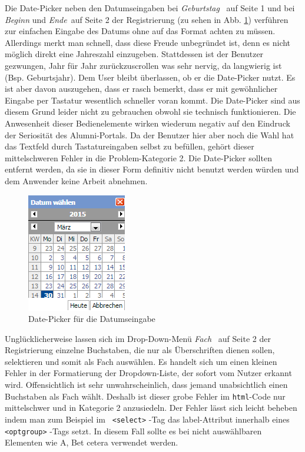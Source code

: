 { Die Date-Picker neben den Datumseingaben bei \emph{Geburtstag} ~auf Seite 1 und bei \emph{Beginn} und \emph{Ende}~auf Seite 2 der Registrierung (zu sehen in Abb. \ref{fig:regdatepick}) verführen zur einfachen Eingabe des Datums ohne auf das Format achten zu müssen. Allerdings merkt man schnell, dass diese Freude unbegründet ist, denn es nicht möglich direkt eine Jahreszahl einzugeben. Stattdessen ist der Benutzer gezwungen, Jahr für Jahr zurückzuscrollen was sehr nervig, da langwierig ist (Bsp. Geburtsjahr).
}
{ Dem User bleibt überlassen, ob er die Date-Picker nutzt. Es ist aber davon auszugehen, dass er rasch bemerkt, dass er mit gewöhnlicher Eingabe per Tastatur wesentlich schneller voran kommt. Die Date-Picker sind aus diesem Grund leider nicht zu gebrauchen obwohl sie technisch funktionieren. Die Anwesenheit dieser Bedienelemente wirken wiederum negativ auf den Eindruck der Seriosität des Alumni-Portals. Da der Benutzer hier aber noch die Wahl hat das Textfeld durch Tastatureingaben selbst zu befüllen, gehört dieser mittelschweren Fehler in die Problem-Kategorie 2.
}
{ Die Date-Picker sollten entfernt werden, da sie in dieser Form definitiv nicht benutzt werden würden und dem Anwender keine Arbeit abnehmen.
}
\label{prob:reg:uselesspickerz}

\begin{figure}
	\centering
		\includegraphics{figures/datepicker.png}
	\caption{Date-Picker für die Datumseingabe}
	\label{fig:regdatepick}
\end{figure}

{ Unglücklicherweise lassen sich im Drop-Down-Menü  \emph{Fach} ~auf Seite 2 der Registrierung einzelne Buchstaben, die nur als Überschriften dienen sollen, selektieren und somit als Fach auswählen. 
}
{ Es handelt sich um einen kleinen Fehler in der Formatierung der Dropdown-Liste, der sofort vom Nutzer erkannt wird. Offensichtlich ist sehr unwahrscheinlich, dass jemand unabsichtlich einen Buchstaben als Fach wählt. Deshalb ist dieser grobe Fehler im \texttt{html}-Code nur mittelschwer und in Kategorie 2 anzusiedeln.
}
{ Der Fehler lässt sich leicht beheben indem man zum Beispiel im \texttt{ \textless select\textgreater} -Tag das label-Attribut innerhalb eines \texttt{ \textless optgroup\textgreater  } -Tags setzt. In diesem Fall sollte es bei nicht auswählbaren Elementen wie \glqq A\grqq, \glqq B\grqq et cetera verwendet werden.
} 
\label{prob:reg:buchstabe}

